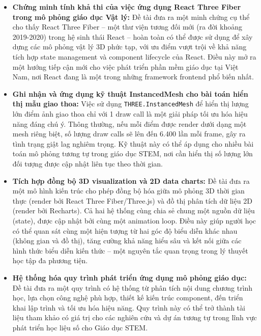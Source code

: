 \begin{itemize}
    \item \textbf{Chứng minh tính khả thi của việc ứng dụng React Three Fiber trong mô phỏng giáo dục Vật lý:} Đề tài đưa ra một minh chứng cụ thể cho thấy React Three Fiber – một thư viện tương đối mới (ra đời khoảng 2019-2020) trong hệ sinh thái React – hoàn toàn có thể được sử dụng để xây dựng các mô phỏng vật lý 3D phức tạp, với ưu điểm vượt trội về khả năng tích hợp state management và component lifecycle của React. Điều này mở ra một hướng tiếp cận mới cho việc phát triển phần mềm giáo dục tại Việt Nam, nơi React đang là một trong những framework frontend phổ biến nhất.
    
    \item \textbf{Ghi nhận và ứng dụng kỹ thuật InstancedMesh cho bài toán hiển thị mẫu giao thoa:} Việc sử dụng \texttt{THREE.InstancedMesh} để hiển thị lượng lớn điểm ảnh giao thoa chỉ với 1 draw call là một giải pháp tối ưu hóa hiệu năng đáng chú ý. Thông thường, nếu mỗi điểm được render dưới dạng một mesh riêng biệt, số lượng draw calls sẽ lên đến 6.400 lần mỗi frame, gây ra tình trạng giật lag nghiêm trọng. Kỹ thuật này có thể áp dụng cho nhiều bài toán mô phỏng tương tự trong giáo dục STEM, nơi cần hiển thị số lượng lớn đối tượng được cập nhật liên tục theo thời gian.
    
    \item \textbf{Tích hợp đồng bộ 3D visualization và 2D data charts:} Đề tài đưa ra một mô hình kiến trúc cho phép đồng bộ hóa giữa mô phỏng 3D thời gian thực (render bởi React Three Fiber/Three.js) và đồ thị phân tích dữ liệu 2D (render bởi Recharts). Cả hai hệ thống cùng chia sẻ chung một nguồn dữ liệu (state), được cập nhật bởi cùng một animation loop. Điều này giúp người học có thể quan sát cùng một hiện tượng từ hai góc độ biểu diễn khác nhau (không gian và đồ thị), tăng cường khả năng hiểu sâu và kết nối giữa các hình thức biểu diễn kiến thức – một nguyên tắc quan trọng trong lý thuyết học tập đa phương tiện.
    
    \item \textbf{Hệ thống hóa quy trình phát triển ứng dụng mô phỏng giáo dục:} Đề tài đưa ra một quy trình có hệ thống từ phân tích nội dung chương trình học, lựa chọn công nghệ phù hợp, thiết kế kiến trúc component, đến triển khai lập trình và tối ưu hóa hiệu năng. Quy trình này có thể trở thành tài liệu tham khảo có giá trị cho các nghiên cứu và dự án tương tự trong lĩnh vực phát triển học liệu số cho Giáo dục STEM.
\end{itemize}

